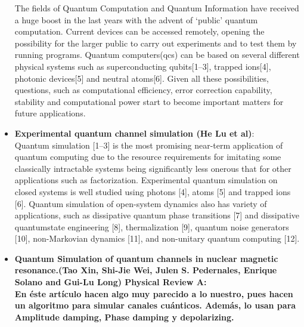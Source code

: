 \documentclass[10pt,letterpaper]{article} %
\begin{document}
\begin{itemize}
The fields of Quantum Computation and Quantum Information have received a huge boost in the last years with
the advent of ‘public’ quantum computation.
{\color{blue} Current devices can be accessed remotely, opening the possibility
for the larger public to carry out experiments and to test them by running programs.} Quantum computers(qcs)
can be based on several different physical systems such as superconducting qubits[1–3], trapped ions[4],
photonic devices[5] and neutral atoms[6]. Given all these possibilities, questions, such as computational
efficiency, error correction capability, stability and computational power start to become important matters for
future applications.\\

\item \textbf{Experimental quantum channel simulation (He Lu et al)}: \\

{ \color{blue} Quantum simulation [1–3] is the most promising near-term
application of quantum computing due to the resource requirements for imitating some classically intractable systems
being significantly less onerous that for other applications
such as factorization.} Experimental quantum simulation on
closed systems is well studied using photons [4], atoms [5]
and trapped ions [6]. Quantum simulation of open-system
dynamics also has variety of applications, such as dissipative quantum phase transitions [7] and dissipative quantumstate engineering [8], thermalization [9], quantum noise generators [10], non-Markovian dynamics [11], and non-unitary
quantum computing [12].

\item \textbf{Quantum Simulation of quantum channels in nuclear magnetic resonance.(Tao Xin, Shi-Jie Wei, Julen S. Pedernales, Enrique Solano and Gui-Lu Long) Physical Review A: }\\

\textbf{En éste artículo hacen algo muy parecido a lo nuestro, pues hacen un algoritmo para simular canales cuánticos. Además, lo usan para Amplitude damping, Phase damping y depolarizing.}\\


\end{itemize}
\end{document}
